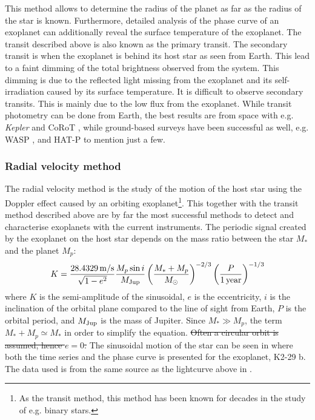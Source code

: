 This method allows to determine the radius of the planet as far as the radius of the star is known.
Furthermore, detailed analysis of the phase curve of an exoplanet can additionally reveal the
surface temperature of the exoplanet. The transit described above is also known as the primary
transit. The secondary transit is when the exoplanet is behind its host star as seen from Earth.
This lead to a faint dimming of the total brightness observed from the system. This dimming is due
to the reflected light missing from the exoplanet and its self-irradiation caused by its surface
temperature. It is difficult to observe secondary transits. This is mainly due to the low flux from
the exoplanet. While transit photometry can be done from Earth, the best results are from space with
e.g. \emph{Kepler} \citep{Borucki2010} and CoRoT \citep{Baglin2006}, while ground-based surveys have
been successful as well, e.g. WASP \citep{Pollacco2006}, and HAT-P \citep{Bakos2004} to mention
just a few.



\subsubsection{Radial velocity method}
\label{sec:rvmethod}

The radial velocity method is the study of the motion of the host star using the Doppler effect
caused by an orbiting exoplanet\footnote{As the transit method, this method has been known for
decades in the study of e.g. binary stars.}. This together with the transit method described above
are by far the most successful methods to detect and characterise exoplanets  with the current
instruments. The periodic signal created by the exoplanet on the host star depends on the mass ratio
between the star $M_\ast$ and the planet $M_p$:
\begin{align}
  K = \frac{\SI{28.4329}{m/s}}{\sqrt{1-e^2}} \frac{M_p\sin i}{M_\mathrm{Jup}} \left( \frac{M_\ast+M_p}{M_\odot} \right)^{-2/3} \left(\frac{P}{\SI{1}{year}}\right)^{-1/3}  \label{eq:rv}
\end{align}
where $K$ is the semi-amplitude of the sinusoidal, $e$ is the eccentricity, $i$ is the inclination
of the orbital plane compared to the line of sight from Earth, $P$ is the orbital period, and
$M_\mathrm{Jup}$ is the mass of Jupiter. Since $M_\ast \gg M_p$, the term $M_\ast+M_p\simeq M_\ast$ in order
to simplify the equation. \st{Often a circular orbit is assumed, hence $e=0$.} The sinusoidal motion
of the star can be seen in  where both the time series and the phase curve is
presented for the exoplanet, K2-29 b. The data used is from the same source as the lightcurve above
in .

